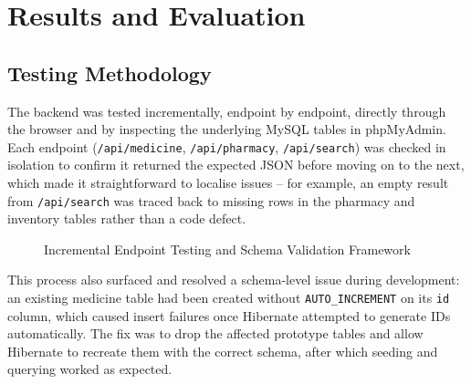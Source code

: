 \documentclass[11pt,a4paper]{report}
\begin{document}
\chapter{Results and Evaluation}

\section{Testing Methodology}

The backend was tested incrementally, endpoint by endpoint, directly through the browser and by inspecting the underlying MySQL tables in phpMyAdmin. Each endpoint (\texttt{/api/medicine}, \texttt{/api/pharmacy}, \texttt{/api/search}) was checked in isolation to confirm it returned the expected JSON before moving on to the next, which made it straightforward to localise issues -- for example, an empty result from \texttt{/api/search} was traced back to missing rows in the pharmacy and inventory tables rather than a code defect.

\begin{figure}[h!]
\centering
{}
\caption{Incremental Endpoint Testing and Schema Validation Framework}
\end{figure}

This process also surfaced and resolved a schema-level issue during development: an existing medicine table had been created without \texttt{AUTO\_INCREMENT} on its \texttt{id} column, which caused insert failures once Hibernate attempted to generate IDs automatically. The fix was to drop the affected prototype tables and allow Hibernate to recreate them with the correct schema, after which seeding and querying worked as expected.
\end{document}
